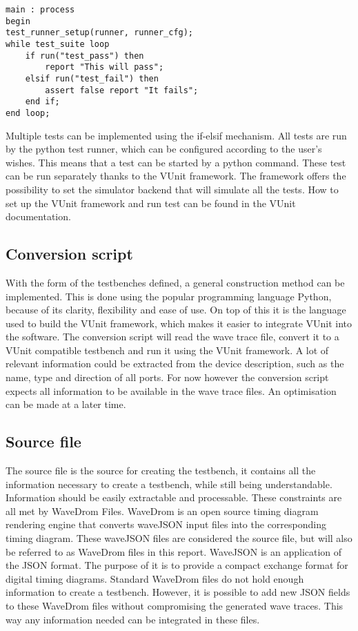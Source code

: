 \begin{lstlisting}[style=vhdl, caption={Main test loop for a VUnit testbench}]
main : process
begin
test_runner_setup(runner, runner_cfg);
while test_suite loop
	if run("test_pass") then
		report "This will pass";
	elsif run("test_fail") then
		assert false report "It fails";
	end if;
end loop;
\end{lstlisting}\nline
Multiple tests can be implemented using the if-elsif mechanism. All tests are run by the python test runner, which can be configured according to the user's wishes. This means that a test can be started by a python command. These test can be run separately thanks to the VUnit framework. The framework offers the possibility to set the simulator backend that will simulate all the tests. How to set up the VUnit framework and run test can be found in the VUnit documentation.
\subsection{Conversion script}
With the form of the testbenches defined, a general construction method can be implemented. This is done using the popular programming language Python, because of its clarity, flexibility and ease of use. On top of this it is the language used to build the VUnit framework, which makes it easier to integrate VUnit into the software.
\npar
The conversion script will read the wave trace file, convert it to a VUnit compatible testbench and run it using the VUnit framework.
\npar
A lot of relevant information could be extracted from the device description, such as the name, type and direction of all ports. For now however the conversion script expects all information to be available in the wave trace files. An optimisation can be made at a later time.
\subsection{Source file}
The source file is the source for creating the testbench, it contains all the information necessary to create a testbench, while still being understandable. Information should be easily extractable and processable. These constraints are all met by WaveDrom Files.
\npar
WaveDrom is an open source timing diagram rendering engine that converts waveJSON input files into the corresponding timing diagram. These waveJSON files are considered the source file, but will also be referred to as WaveDrom files in this report.
\npar
WaveJSON \cite{wavejson} is an application of the JSON format. The purpose of it is to provide a compact exchange format for digital timing diagrams.
\npar
Standard WaveDrom files do not hold enough information to create a testbench. However, it is possible to add new JSON fields to these WaveDrom files without compromising the generated wave traces. This way any information needed can be integrated in these files.

